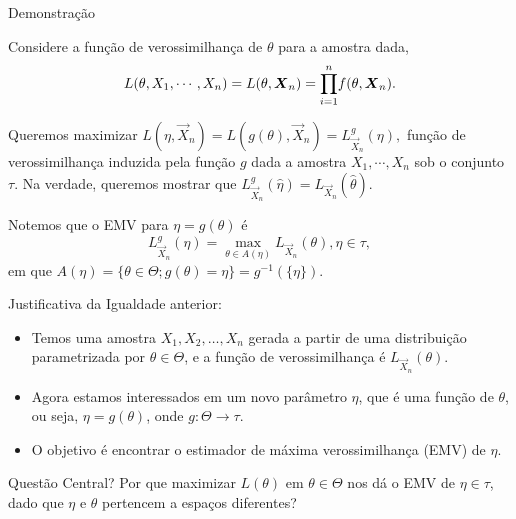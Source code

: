 \documentclass[12pt]{beamer}
\begin{document}
\begin{frame}{Demonstração}
	\begin{block}{}
		\justifying
Considere a função de verossimilhança de $\theta$ para a amostra dada, $$L(\theta,X_{1},\cdots, X_{n})=L(\theta,\mbox{\boldmath$X$}_{n})=\displaystyle {\displaystyle \prod_{i=1}^{n}} f(\theta,\mbox{\boldmath$X$}_{n}).$$

Queremos maximizar $L(\eta,\vec{X}_{n})=L(g(\theta),\vec{X}_{n})=L_{\vec{X}_{n}}^{g}(\eta),$ função de verossimilhança induzida pela função $g$ dada a amostra $X_{1},\cdots, X_{n}$ sob o conjunto $\tau.$ Na verdade, queremos mostrar que $L_{\vec{X}_{n}}^{g}(\hat{\eta})=L_{\vec{X}_{n}}(\hat{\theta}).$
	\end{block}
	\pause
		\begin{block}{}
		\justifying
		Notemos que o EMV para $\eta=g(\theta)$ é $$L_{\vec{X}_{n}}^{g}(\eta)={\displaystyle \max_{\theta \in A(\eta)}} L_{\vec{X}_{n}}(\theta), \eta\in \tau,$$ em que $A(\eta)=\{\theta\in\Theta;g(\theta)=\eta\}=g^{-1}(\{\eta\}).$
	\end{block}
\end{frame}

\begin{frame}{Justificativa da Igualdade anterior:}
	\begin{block}{}
		\begin{itemize}
			\justifying
			\item Temos uma amostra \( X_1, X_2, \dots, X_n \) gerada a partir de uma distribuição parametrizada por \( \theta \in \Theta \), e a função de verossimilhança é \( L_{\vec{X}_n}(\theta) \).
			\item Agora estamos interessados em um novo parâmetro \( \eta \), que é uma função de \( \theta \), ou seja, \( \eta = g(\theta) \), onde \( g: \Theta \rightarrow \tau \).
			\item O objetivo é encontrar o estimador de máxima verossimilhança (EMV) de \( \eta \).
		\end{itemize}
	\end{block}
	\pause
	\begin{block}{Questão Central?}
		Por que maximizar \( L(\theta) \) em \( \theta \in \Theta \) nos dá o EMV de \( \eta \in \tau \), dado que \( \eta \) e \( \theta \) pertencem a espaços diferentes?
	\end{block}
\end{frame}
\end{document}
